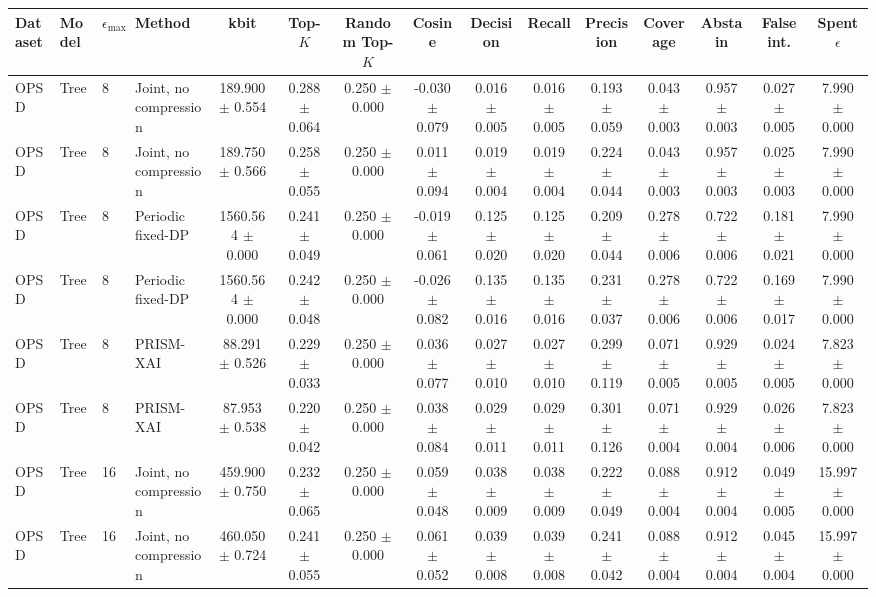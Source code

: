 \begin{tabular}{llllccccccccccc}
\toprule
Dataset & Model & $\epsilon_{\max}$ & Method & kbit & Top-$K$ & Random Top-$K$ & Cosine & Decision & Recall & Precision & Coverage & Abstain & False int. & Spent $\epsilon$ \\
\midrule
OPSD & Tree & 8 & Joint, no compression & 189.900 $\pm$ 0.554 & 0.288 $\pm$ 0.064 & 0.250 $\pm$ 0.000 & -0.030 $\pm$ 0.079 & 0.016 $\pm$ 0.005 & 0.016 $\pm$ 0.005 & 0.193 $\pm$ 0.059 & 0.043 $\pm$ 0.003 & 0.957 $\pm$ 0.003 & 0.027 $\pm$ 0.005 & 7.990 $\pm$ 0.000 \\
OPSD & Tree & 8 & Joint, no compression & 189.750 $\pm$ 0.566 & 0.258 $\pm$ 0.055 & 0.250 $\pm$ 0.000 & 0.011 $\pm$ 0.094 & 0.019 $\pm$ 0.004 & 0.019 $\pm$ 0.004 & 0.224 $\pm$ 0.044 & 0.043 $\pm$ 0.003 & 0.957 $\pm$ 0.003 & 0.025 $\pm$ 0.003 & 7.990 $\pm$ 0.000 \\
OPSD & Tree & 8 & Periodic fixed-DP & 1560.564 $\pm$ 0.000 & 0.241 $\pm$ 0.049 & 0.250 $\pm$ 0.000 & -0.019 $\pm$ 0.061 & 0.125 $\pm$ 0.020 & 0.125 $\pm$ 0.020 & 0.209 $\pm$ 0.044 & 0.278 $\pm$ 0.006 & 0.722 $\pm$ 0.006 & 0.181 $\pm$ 0.021 & 7.990 $\pm$ 0.000 \\
OPSD & Tree & 8 & Periodic fixed-DP & 1560.564 $\pm$ 0.000 & 0.242 $\pm$ 0.048 & 0.250 $\pm$ 0.000 & -0.026 $\pm$ 0.082 & 0.135 $\pm$ 0.016 & 0.135 $\pm$ 0.016 & 0.231 $\pm$ 0.037 & 0.278 $\pm$ 0.006 & 0.722 $\pm$ 0.006 & 0.169 $\pm$ 0.017 & 7.990 $\pm$ 0.000 \\
OPSD & Tree & 8 & PRISM-XAI & 88.291 $\pm$ 0.526 & 0.229 $\pm$ 0.033 & 0.250 $\pm$ 0.000 & 0.036 $\pm$ 0.077 & 0.027 $\pm$ 0.010 & 0.027 $\pm$ 0.010 & 0.299 $\pm$ 0.119 & 0.071 $\pm$ 0.005 & 0.929 $\pm$ 0.005 & 0.024 $\pm$ 0.005 & 7.823 $\pm$ 0.000 \\
OPSD & Tree & 8 & PRISM-XAI & 87.953 $\pm$ 0.538 & 0.220 $\pm$ 0.042 & 0.250 $\pm$ 0.000 & 0.038 $\pm$ 0.084 & 0.029 $\pm$ 0.011 & 0.029 $\pm$ 0.011 & 0.301 $\pm$ 0.126 & 0.071 $\pm$ 0.004 & 0.929 $\pm$ 0.004 & 0.026 $\pm$ 0.006 & 7.823 $\pm$ 0.000 \\
OPSD & Tree & 16 & Joint, no compression & 459.900 $\pm$ 0.750 & 0.232 $\pm$ 0.065 & 0.250 $\pm$ 0.000 & 0.059 $\pm$ 0.048 & 0.038 $\pm$ 0.009 & 0.038 $\pm$ 0.009 & 0.222 $\pm$ 0.049 & 0.088 $\pm$ 0.004 & 0.912 $\pm$ 0.004 & 0.049 $\pm$ 0.005 & 15.997 $\pm$ 0.000 \\
OPSD & Tree & 16 & Joint, no compression & 460.050 $\pm$ 0.724 & 0.241 $\pm$ 0.055 & 0.250 $\pm$ 0.000 & 0.061 $\pm$ 0.052 & 0.039 $\pm$ 0.008 & 0.039 $\pm$ 0.008 & 0.241 $\pm$ 0.042 & 0.088 $\pm$ 0.004 & 0.912 $\pm$ 0.004 & 0.045 $\pm$ 0.004 & 15.997 $\pm$ 0.000 \\

\end{tabular}
